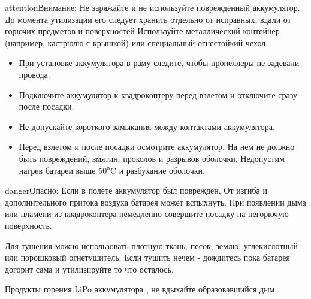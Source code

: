 \documentclass[a4paper,10pt,russian]{sphinxmanual}
\begin{document}
\begin{sphinxadmonition}{attention}{Внимание:}
Не заряжайте и не используйте поврежденный аккумулятор. До момента утилизации его следует хранить отдельно от исправных, вдали от горючих предметов и поверхностей Используйте металлический контейнер (например, кастрюлю с крышкой) или специальный огнестойкий чехол.
\end{sphinxadmonition}

\begin{itemize}
\item {} 
При установке аккумулятора в раму следите, чтобы пропеллеры не задевали провода.

\item {} 
Подключите аккумулятор к квадрокоптеру перед взлетом и отключите сразу после посадки.

\item {} 
Не допускайте короткого замыкания между контактами аккумулятора.

\item {} 
Перед взлетом и после посадки осмотрите аккумулятор. На нём не должно быть повреждений, вмятин, проколов и разрывов оболочки. Недопустим нагрев батареи выше 50$^{\text{о}}$C и разбухание оболочки.

\end{itemize}

\begin{sphinxadmonition}{danger}{Опасно:}
Если в полете аккумулятор был поврежден,  От изгиба и дополнительного притока воздуха батарея может вспыхнуть. При появлении дыма или пламени из квадрокоптера немедленно совершите посадку на негорючую поверхность.

 Для тушения можно использовать плотную ткань, песок, землю, углекислотный или порошковый огнетушитель. Если тушить нечем - дождитесь пока батарея догорит сама и утилизируйте то что осталось.

Продукты горения LiPo аккумулятора , не вдыхайте образовавшийся дым.
\end{sphinxadmonition}
\end{document}
